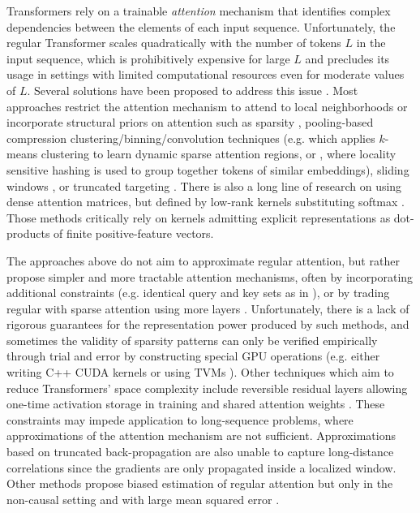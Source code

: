 Transformers rely on a trainable \textit{attention} mechanism that identifies complex dependencies between the elements of each input sequence. Unfortunately, the regular Transformer scales quadratically with the number of tokens $L$ in the input sequence, which is prohibitively expensive for large $L$ and precludes its usage in settings with limited computational resources even for moderate values of $L$. Several solutions have been proposed to address this issue \citep{longformer, conformer, imputer, sparsetr, image_transformer}. Most approaches restrict the attention mechanism to attend to local neighborhoods \citep{parmar} or incorporate structural priors on attention such as sparsity \citep{sparsetr}, pooling-based compression \citep{compr} clustering/binning/convolution techniques (e.g. \citep{routing_t} which applies $k$-means clustering to learn dynamic sparse attention regions, or \citep{reformer}, where locality sensitive hashing is used to group together tokens of similar embeddings), sliding windows \citep{longformer}, or truncated targeting \citep{chelba}. There is also a long line of research on using dense attention matrices, but defined by low-rank kernels substituting softmax \citep{trans-rnns, shen}. Those methods critically rely on kernels admitting explicit representations as dot-products of finite positive-feature vectors.

The approaches above do not aim to approximate regular attention, but rather propose simpler and more tractable attention mechanisms, often by incorporating additional constraints (e.g. identical query and key sets as in \citep{reformer}), or by trading regular with sparse attention using more layers \citep{sparsetr}. Unfortunately, there is a lack of rigorous guarantees for the representation power produced by such methods, and sometimes the validity of sparsity patterns can only be verified empirically through trial and error by constructing special GPU operations (e.g. either writing C++ CUDA kernels \citep{sparsetr} or using TVMs \citep{longformer}). Other techniques which aim to reduce Transformers' space complexity include reversible residual layers allowing one-time activation storage in training \citep{reformer} and shared attention weights \citep{shared_weights}. These constraints may impede application to long-sequence problems, where approximations of the attention mechanism are not sufficient. Approximations based on truncated back-propagation \citep{transformerxl} are also unable to capture long-distance correlations since the gradients are only propagated inside a localized window. Other methods propose biased estimation of regular attention but only in the non-causal setting and with large mean squared error \citep{linformer}.

